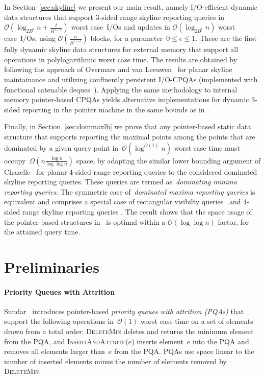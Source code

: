 \documentclass[]{article}
\newcommand{\bigO}{\mathcal{O}}
\begin{document}
In Section~\ref{sec:skyline} we present our main result, namely I/O-efficient
dynamic data structures that support 3-sided range skyline reporting queries in
$\bigO(\log_{2B^\epsilon} n + \frac{t}{B^{1-\epsilon}})$ worst case~I/Os and
updates in $\bigO(\log_{2B^\epsilon} n)$ worst case~I/Os, using
$\bigO(\frac{n}{B^{1-\epsilon}})$ blocks, for a parameter~$0\leq \epsilon \leq
1$. These are the first fully dynamic skyline data structures for external
memory that support all operations in polylogarithmic worst case time. The
results are obtained by following the approach of Overmars and van
Leeuwen~\cite{OL81} for planar skyline maintainance and utilizing confluently
persistent I/O-CPQAs (implemented with functional catenable deques~\cite{KT99}).
Applying the same methodology to internal memory pointer-based CPQAs yields
alternative implementations for dynamic 3-sided reporting in the pointer machine in the same bounds as in~\cite{BT11}.

Finally, in Section~\ref{sec:dommaxlb} we prove that any pointer-based static
data structure that supports reporting the maximal points among the points that
are dominated by a given query point in~$\bigO(\log^{\bigO(1)}n)$ worst case
time must occupy~$\Omega(n \frac{\log n}{\log \log n})$ space, by adapting the
similar lower bounding argument of Chazelle~\cite{C90} for planar 4-sided range
reporting queries to the considered dominated skyline reporting queries. These
queries are termed as~\textit{dominating minima reporting queries}. The
symmetric case of~\textit{dominated maxima reporting queries} is equivalent and
comprises a special case of rectangular visibilty queries~\cite{OW88} and
4-sided range skyline reporting queries \cite{BT11,KDKS11}. The result shows
that the space usage of the pointer-based structures in~\cite{OW88,BT11,KDKS11}
is optimal within a $\bigO(\log \log n)$ factor, for the attained query time.

\section{Preliminaries} \label{sect:prel}


\paragraph{Priority Queues with Attrition} 

Sundar~\cite{S89} introduces pointer-based \emph{priority queues with attrition
(PQAs)} that support the following operations in~$\bigO(1)$ worst case time on
a set of elements drawn from a total order: \textsc{DeleteMin} deletes and
returns the minimum element from the PQA, and \textsc{InsertAndAttrite($e$)}
inserts element~$e$ into the PQA and removes all elements larger than~$e$ from
the PQA. PQAs use space linear to the number of inserted elements minus the
number of elements removed by \textsc{DeleteMin}.
\end{document}
